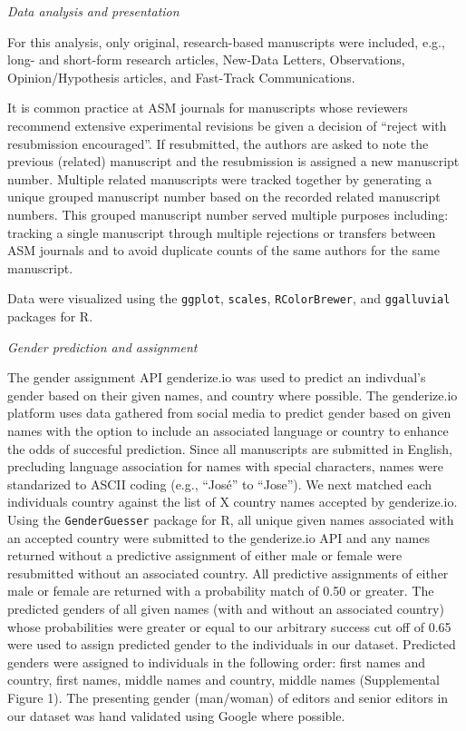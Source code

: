 \documentclass[11pt,]{article}
\begin{document}
\emph{Data analysis and presentation}

For this analysis, only original, research-based manuscripts were
included, e.g., long- and short-form research articles, New-Data
Letters, Observations, Opinion/Hypothesis articles, and Fast-Track
Communications.

It is common practice at ASM journals for manuscripts whose reviewers
recommend extensive experimental revisions be given a decision of
``reject with resubmission encouraged''. If resubmitted, the authors are
asked to note the previous (related) manuscript and the resubmission is
assigned a new manuscript number. Multiple related manuscripts were
tracked together by generating a unique grouped manuscript number based
on the recorded related manuscript numbers. This grouped manuscript
number served multiple purposes including: tracking a single manuscript
through multiple rejections or transfers between ASM journals and to
avoid duplicate counts of the same authors for the same manuscript.

Data were visualized using the \texttt{ggplot}, \texttt{scales},
\texttt{RColorBrewer}, and \texttt{ggalluvial} packages for R.

\emph{Gender prediction and assignment}

The gender assignment API genderize.io was used to predict an
indivdual's gender based on their given names, and country where
possible. The genderize.io platform uses data gathered from social media
to predict gender based on given names with the option to include an
associated language or country to enhance the odds of succesful
prediction. Since all manuscripts are submitted in English, precluding
language association for names with special characters, names were
standarized to ASCII coding (e.g., ``José'' to ``Jose''). We next
matched each individuals country against the list of X country names
accepted by genderize.io. Using the \texttt{GenderGuesser} package for
R, all unique given names associated with an accepted country were
submitted to the genderize.io API and any names returned without a
predictive assignment of either male or female were resubmitted without
an associated country. All predictive assignments of either male or
female are returned with a probability match of 0.50 or greater. The
predicted genders of all given names (with and without an associated
country) whose probabilities were greater or equal to our arbitrary
success cut off of 0.65 were used to assign predicted gender to the
individuals in our dataset. Predicted genders were assigned to
individuals in the following order: first names and country, first
names, middle names and country, middle names (Supplemental Figure 1).
The presenting gender (man/woman) of editors and senior editors in our
dataset was hand validated using Google where possible.
\end{document}
